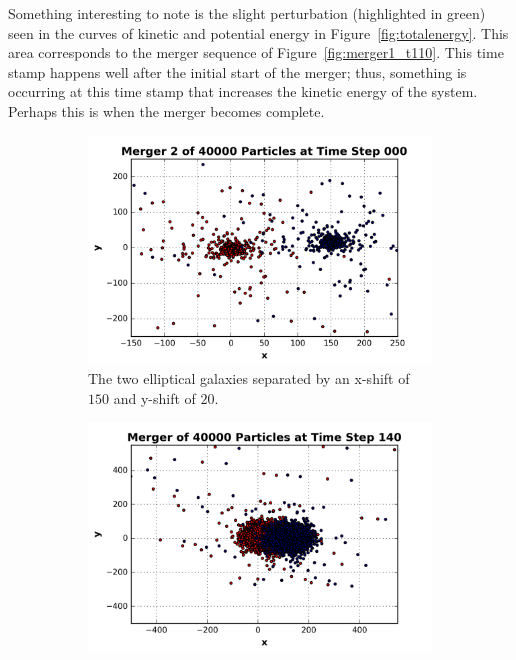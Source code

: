 \documentclass[12pt]{report}
\begin{document}
Something interesting to note is the slight perturbation (highlighted in green) seen in the curves of kinetic and potential energy in Figure~\ref{fig:totalenergy}. This area corresponds to the merger sequence of Figure~\ref{fig:merger1_t110}. This time stamp happens well after the initial start of the merger; thus, something is occurring at this time stamp that increases the kinetic energy of the system. Perhaps this is when the merger becomes complete.

\begin{figure}[H]
        \centering
        \begin{subfigure}[b]{0.48\textwidth}
            \centering
            \includegraphics[width=\linewidth]{merger2t000.png}
            \caption[]%
            {{\small The two elliptical galaxies separated by an x-shift of $150$ and y-shift of $20$.}}    
            \label{fig:merger2_t00}
        \end{subfigure}
        \hfill
        \begin{subfigure}[b]{0.48\textwidth}  
            \centering 
            \includegraphics[width=\linewidth]{merger2_t140.png}

\end{subfigure}
\end{figure}
\end{document}
